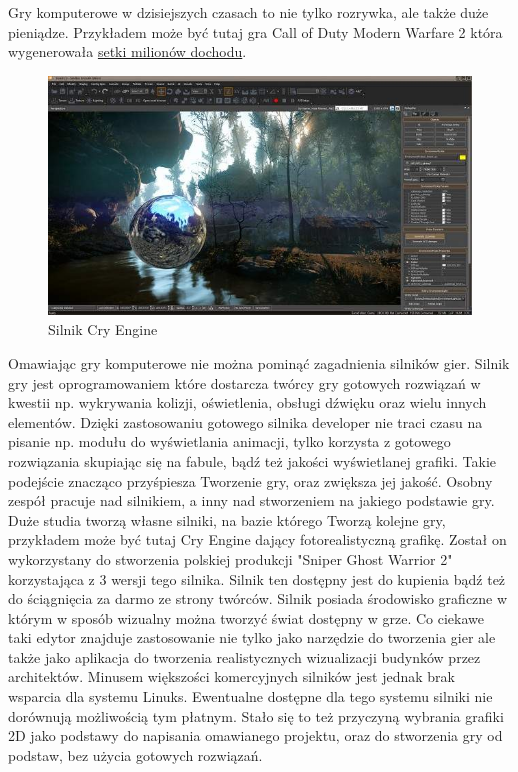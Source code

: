 Gry komputerowe w dzisiejszych czasach to nie tylko rozrywka, ale także duże pieniądze. Przykładem może być tutaj gra Call of Duty Modern Warfare 2 która wygenerowała \href{http://www.cdaction.pl/news-10119/wiedziales-call-of-duty-wygenerowalo-3-miliardy--dolarow-przychodu.html}{setki milionów dochodu}.
 
\begin{figure}[h]
    \centering
    \includegraphics[height=240px]{./Pictures/cryengine.jpg}
    \caption{Silnik Cry Engine}
\end{figure}
  
Omawiając gry komputerowe nie można pominąć zagadnienia silników gier. Silnik gry jest oprogramowaniem które dostarcza twórcy gry gotowych rozwiązań w kwestii np. wykrywania kolizji, oświetlenia, obsługi dźwięku oraz wielu innych elementów. Dzięki zastosowaniu gotowego silnika developer nie traci czasu na pisanie np. modułu do wyświetlania animacji, tylko korzysta z gotowego rozwiązania skupiając się na fabule, bądź też jakości wyświetlanej grafiki. Takie podejście znacząco przyśpiesza Tworzenie gry, oraz zwiększa jej jakość. Osobny zespół pracuje nad silnikiem, a inny nad stworzeniem na jakiego podstawie gry. Duże studia tworzą własne silniki, na bazie którego Tworzą kolejne gry, przykładem może być tutaj Cry Engine dający fotorealistyczną grafikę. Został on wykorzystany do stworzenia polskiej produkcji "Sniper Ghost Warrior 2" korzystająca z  3 wersji tego silnika. Silnik ten dostępny jest do kupienia bądź też do ściągnięcia za darmo ze strony twórców. Silnik posiada środowisko graficzne w którym w sposób wizualny można tworzyć świat dostępny w grze. Co ciekawe taki edytor znajduje zastosowanie nie tylko jako narzędzie do tworzenia gier ale także jako aplikacja do tworzenia realistycznych wizualizacji budynków przez architektów. Minusem większości komercyjnych silników jest jednak brak wsparcia dla systemu Linuks. Ewentualne dostępne dla tego systemu silniki nie dorównują możliwością tym płatnym. Stało się to też przyczyną wybrania grafiki 2D jako podstawy do napisania omawianego projektu, oraz do stworzenia gry od podstaw, bez użycia gotowych rozwiązań. 

